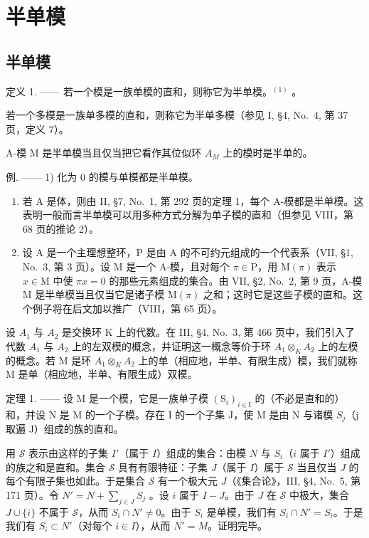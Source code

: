 \section{半单模}

\subsection{半单模}

定义 1. —— 若一个模是一族单模的直和，则称它为半单模。\(^{(1)}\) 。

若一个多模是一族单多模的直和，则称它为半单多模（参见 I, §4, No.~4, 第 37 页，定义 7）。

A-模 M 是半单模当且仅当把它看作其位似环 \(A_{M}\) 上的模时是半单的。

例. —— 1) 化为 0 的模与单模都是半单模。

\begin{enumerate}
\def\labelenumi{\arabic{enumi})}
\setcounter{enumi}{1}
\item
  若 A 是体，则由 II, §7, No.~1, 第 292 页的定理 1，每个 A-模都是半单模。这表明一般而言半单模可以用多种方式分解为单子模的直和（但参见 VIII，第 68 页的推论 2）。
\item
  设 A 是一个主理想整环，P 是由 A 的不可约元组成的一个代表系（VII, §1, No.~3, 第 3 页）。设 M 是一个 A-模，且对每个 \(\pi \in \mathrm{P}\)，用 \(\mathrm{M}(\pi)\) 表示 \(x \in \mathrm{M}\) 中使 \(\pi x = 0\) 的那些元素组成的集合。由 VII, §2, No.~2, 第 9 页，A-模 M 是半单模当且仅当它是诸子模 \(\mathrm{M}(\pi)\) 之和；这时它是这些子模的直和。这个例子将在后文加以推广（VIII，第 65 页）。
\end{enumerate}

设 \(A_{1}\) 与 \(A_{2}\) 是交换环 K 上的代数。在 III, §4, No.~3, 第 466 页中，我们引入了代数 \(A_{1}\) 与 \(A_{2}\) 上的左双模的概念，并证明这一概念等价于环 \(A_{1} \otimes_{K} A_{2}\) 上的左模的概念。若 M 是环 \(A_{1} \otimes_{K} A_{2}\) 上的单（相应地，半单、有限生成）模，我们就称 M 是单（相应地，半单、有限生成）双模。

定理 1. —— 设 M 是一个模，它是一族单子模 \((\mathrm{S}_{i})_{i\in\mathrm{I}}\) 的（不必是直和的）和，并设 N 是 M 的一个子模。存在 I 的一个子集 J，使 M 是由 N 与诸模 \(S_{j}\)（j 取遍 J）组成的族的直和。

用 \(\mathcal{S}\) 表示由这样的子集 \(I'\)（属于 \(I\)）组成的集合：由模 \(N\) 与 \(S_i\)（\(i\) 属于 \(I'\)）组成的族之和是直和。集合 \(\mathcal{S}\) 具有有限特征：子集 \(J\)（属于 \(I\)）属于 \(\mathcal{S}\) 当且仅当 \(J\) 的每个有限子集也如此。于是集合 \(\mathcal{S}\) 有一个极大元 \(J\)（《集合论》，III, §4, No.~5, 第 171 页）。令 \(N' = N + \sum_{j \in J} S_j\) 。设 \(i\) 属于 \(I - J\)。由于 \(J\) 在 \(\mathcal{S}\) 中极大，集合 \(J \cup \{i\}\) 不属于 \(\mathcal{S}\)，从而 \(S_i \cap N' \neq 0\)。由于 \(S_i\) 是单模，我们有 \(S_i \cap N' = S_i\)。于是我们有 \(S_i \subset N'\)（对每个 \(i \in I\)），从而 \(N' = M\)。证明完毕。

